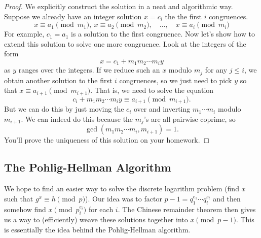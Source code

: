 \documentclass[12pt]{article}
\theoremstyle{plain}
\theoremstyle{definition}
\theoremstyle{remark}
\begin{document}
\begin{proof}
    We explicitly construct the solution in a neat and algorithmic way.
    Suppose we already have an integer solution $x = c_i$ the the first $i$ congruences.
    \[
        x \equiv a_1\pmod{m_1},\ x\equiv a_2\pmod{m_2},\quad \ldots,\quad x \equiv a_i\pmod{m_i}
    \]
    For example, $c_1 = a_1$ is a solution to the first congruence.
    Now let's show how to extend this solution to solve one more congruence.
    Look at the integers of the form
    \[
        x = c_1 + m_1m_2\cdots m_iy
    \]
    as $y$ ranges over the integers.
    If we reduce such an $x$ modulo $m_j$ for any $j\leq i$, we obtain another solution to the first $i$ congruences, so we just need to pick $y$ so that $x\equiv a_{i+1}\pmod{m_{i+1}}$.
    That is, we need to solve the equation
    \[
        c_i + m_1m_2\cdots m_i y \equiv a_{i+1}\pmod{m_{i+1}}.
    \]
    But we can do this by just moving the $c_i$ over and inverting $m_1\cdots m_i$ modulo $m_{i+1}$.
    We can indeed do this because the $m_j$'s are all pairwise coprime, so
    \[
        \gcd(m_1m_2\cdots m_i, m_{i+1}) = 1.
    \]
    You'll prove the uniqueness of this solution on your homework.
\end{proof}











\subsection{The Pohlig-Hellman Algorithm}
We hope to find an easier way to solve the discrete logarithm problem (find $x$ such that $g^x \equiv h\pmod p$).
Our idea was to factor $p-1 = q_1^{e_1}\cdots q_t^{e_t}$ and then somehow find $x\pmod{p_i^{e_i}}$ for each $i$.
The Chinese remainder theorem then gives us a way to (efficiently) weave these solutions together into $x\pmod{p-1}$.
This is essentially the idea behind the Pohlig-Hellman algorithm.
\end{document}
